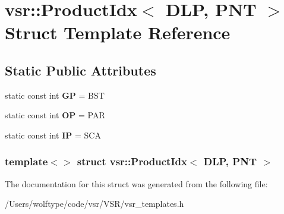\hypertarget{structvsr_1_1_product_idx_3_01_d_l_p_00_01_p_n_t_01_4}{\section{vsr\-:\-:Product\-Idx$<$ D\-L\-P, P\-N\-T $>$ Struct Template Reference}
\label{structvsr_1_1_product_idx_3_01_d_l_p_00_01_p_n_t_01_4}
}
\subsection*{Static Public Attributes}
\begin{DoxyCompactItemize}
\item 
\hypertarget{structvsr_1_1_product_idx_3_01_d_l_p_00_01_p_n_t_01_4_a94ceabb581e0f4ae6d70dd161a91be99}{static const int {\bfseries G\-P} = B\-S\-T}\label{structvsr_1_1_product_idx_3_01_d_l_p_00_01_p_n_t_01_4_a94ceabb581e0f4ae6d70dd161a91be99}

\item 
\hypertarget{structvsr_1_1_product_idx_3_01_d_l_p_00_01_p_n_t_01_4_a65136194e16036fd854e349998139441}{static const int {\bfseries O\-P} = P\-A\-R}\label{structvsr_1_1_product_idx_3_01_d_l_p_00_01_p_n_t_01_4_a65136194e16036fd854e349998139441}

\item 
\hypertarget{structvsr_1_1_product_idx_3_01_d_l_p_00_01_p_n_t_01_4_afd0a06222109905a07e7bc439b6dfc25}{static const int {\bfseries I\-P} = S\-C\-A}\label{structvsr_1_1_product_idx_3_01_d_l_p_00_01_p_n_t_01_4_afd0a06222109905a07e7bc439b6dfc25}

\end{DoxyCompactItemize}
\subsubsection*{template$<$$>$ struct vsr\-::\-Product\-Idx$<$ D\-L\-P, P\-N\-T $>$}



The documentation for this struct was generated from the following file\-:\begin{DoxyCompactItemize}
\item 
/\-Users/wolftype/code/vsr/\-V\-S\-R/vsr\-\_\-templates.\-h\end{DoxyCompactItemize}
